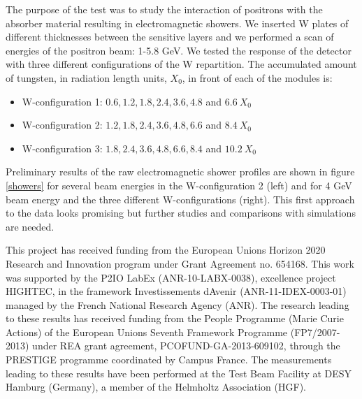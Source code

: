 \documentclass[a4paper,11pt]{article}
\begin{document}
The purpose of the test was to study the interaction of positrons with the absorber material resulting in
electromagnetic showers.
We inserted W plates of different thicknesses between the sensitive layers and we performed
a scan of energies of the positron beam: 1-5.8 GeV.
We tested the response of the detector with three different configurations of the W repartition.
The accumulated amount of tungsten, in radiation length units, $X_{0}$, in front of each of the modules is:
\begin{itemize}
\item W-configuration 1: $0.6,1.2,1.8,2.4,3.6,4.8$ and $6.6~X_{0}$
\item W-configuration 2: $1.2,1.8,2.4,3.6,4.8,6.6$ and $8.4~X_{0}$
\item W-configuration 3: $1.8,2.4,3.6,4.8,6.6,8.4$ and $10.2~X_{0}$
\end{itemize}
Preliminary results of the raw electromagnetic shower profiles are shown in figure \ref{showers}
for several beam energies in the W-configuration 2 (left) and for 4 GeV beam energy and the three different W-configurations (right). This first approach to the data looks promising but further studies and comparisons with simulations are needed.


\acknowledgments

This project has received funding from the European Union{\textquotesingle}s Horizon 2020 Research and Innovation program under Grant Agreement no. 654168.
This work was supported by the P2IO LabEx (ANR-10-LABX-0038), excellence project HIGHTEC,
in the framework {\textquotesingle}Investissements d{\textquotesingle}Avenir{\textquotesingle}
(ANR-11-IDEX-0003-01) managed by the French National Research Agency (ANR).
The research leading to these results has received funding from the People Programme (Marie
Curie Actions) of the European Union{\textquotesingle}s Seventh Framework Programme (FP7/2007-2013)
under REA grant agreement, PCOFUND-GA-2013-609102, through the PRESTIGE
programme coordinated by Campus France.
The measurements leading to these results have been performed at the Test Beam Facility at DESY Hamburg (Germany), a member of the Helmholtz Association (HGF).


\end{document}
